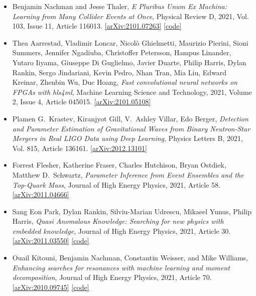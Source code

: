 \begin{itemize}
\item Benjamin Nachman and Jesse Thaler, \textit{E Pluribus Unum Ex Machina: Learning from Many Collider Events at Once}, Physical Review D, 2021, Vol. 103, Issue 11, Article 116013. \href{https://arxiv.org/abs/2101.07263}{[arXiv:2101.07263]}  \href{https://github.com/bnachman/EnsembleLearning}{[code]} 
\item Thea Aarrestad, Vladimir Loncar, Nicolò Ghielmetti, Maurizio Pierini, Sioni Summers, Jennifer Ngadiuba, Christoffer Petersson, Hampus Linander, Yutaro Iiyama, Giuseppe Di Guglielmo, Javier Duarte, Philip Harris, Dylan Rankin, Sergo Jindariani, Kevin Pedro, Nhan Tran, Mia Liu, Edward Kreinar, Zhenbin Wu, Duc Hoang, \textit{Fast convolutional neural networks on FPGAs with hls4ml}, Machine Learning Science and Technology, 2021, Volume 2, Issue 4, Article 045015. \href{https://arxiv.org/abs/2101.05108}{[arXiv:2101.05108]} 
\item Plamen G.\  Krastev, Kiranjyot Gill, V.\  Ashley Villar, Edo Berger, \textit{Detection and Parameter Estimation of Gravitational Waves from Binary Neutron-Star Mergers in Real LIGO Data using Deep Learning}, Physics Letters B, 2021, Vol. 815, Article 136161. \href{https://arxiv.org/abs/2012.13101}{[arXiv:2012.13101]} 
\item Forrest Flesher, Katherine Fraser, Charles Hutchison, Bryan Ostdiek, Matthew D.\  Schwartz, \textit{Parameter Inference from Event Ensembles and the Top-Quark Mass}, Journal of High Energy Physics, 2021, Article 58. \href{https://arxiv.org/abs/2011.04666}{[arXiv:2011.04666]} 
\item Sang Eon Park, Dylan Rankin, Silviu-Marian Udrescu, Mikaeel Yunus, Philip Harris, \textit{Quasi Anomalous Knowledge: Searching for new physics with embedded knowledge}, Journal of High Energy Physics, 2021, Article 30. \href{https://arxiv.org/abs/2011.03550}{[arXiv:2011.03550]}  \href{https://github.com/SangeonPark/QUAK}{[code]} 
\item Ouail Kitouni, Benjamin Nachman, Constantin Weisser, and Mike Williams, \textit{Enhancing searches for resonances with machine learning and moment decomposition}, Journal of High Energy Physics, 2021, Article 70. \href{https://arxiv.org/abs/2010.09745}{[arXiv:2010.09745]}  \href{https://github.com/okitouni/MoDe}{[code]} 
\end{itemize}